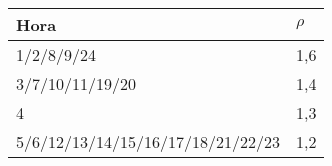 \begin{tabular}{ll}
\toprule
Hora & $\rho$ \\
\midrule
1/2/8/9/24 & 1,6 \\
3/7/10/11/19/20 & 1,4 \\
4 & 1,3 \\
5/6/12/13/14/15/16/17/18/21/22/23 & 1,2 \\
\bottomrule
\end{tabular}
